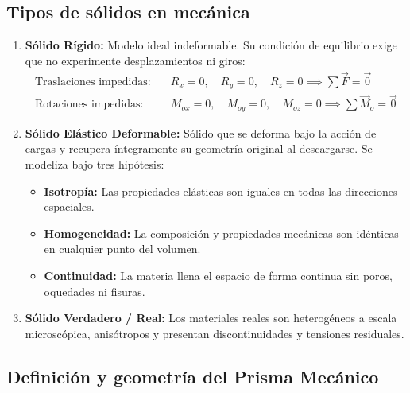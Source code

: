 \subsection{Tipos de sólidos en mecánica}
\begin{enumerate}
    \item \textbf{Sólido Rígido:} Modelo ideal indeformable. Su condición de equilibrio exige que no experimente desplazamientos ni giros:
          \begin{align}
              \text{Traslaciones impedidas:} & \quad R_x = 0, \quad R_y = 0, \quad R_z = 0 \implies \sum \vec{F} = \vec{0}            \\
              \text{Rotaciones impedidas:}   & \quad M_{ox} = 0, \quad M_{oy} = 0, \quad M_{oz} = 0 \implies \sum \vec{M}_o = \vec{0}
          \end{align}
    \item \textbf{Sólido Elástico Deformable:} Sólido que se deforma bajo la acción de cargas y recupera íntegramente su geometría original al descargarse. Se modeliza bajo tres hipótesis:
          \begin{itemize}
              \item \textbf{Isotropía:} Las propiedades elásticas son iguales en todas las direcciones espaciales.
              \item \textbf{Homogeneidad:} La composición y propiedades mecánicas son idénticas en cualquier punto del volumen.
              \item \textbf{Continuidad:} La materia llena el espacio de forma continua sin poros, oquedades ni fisuras.
          \end{itemize}
    \item \textbf{Sólido Verdadero / Real:} Los materiales reales son heterogéneos a escala microscópica, anisótropos y presentan discontinuidades y tensiones residuales.
\end{enumerate}

\subsection{Definición y geometría del Prisma Mecánico}


